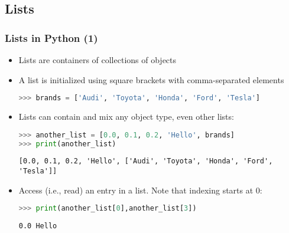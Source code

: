 \subsection{Lists}
\begin{frame}[fragile]
  \frametitle{Lists in Python (1)}
  \begin{itemize}
    \item Lists are containers of collections of objects
    \item A list is initialized using square brackets with comma-separated elements
    \begin{lstlisting}[language=Python,numbers=none]
>>> brands = ['Audi', 'Toyota', 'Honda', 'Ford', 'Tesla']
    \end{lstlisting}
    \item Lists can contain and mix any object type, even other lists:
    \begin{lstlisting}[language=Python,numbers=none]
>>> another_list = [0.0, 0.1, 0.2, 'Hello', brands]
>>> print(another_list)
    \end{lstlisting}
    \begin{lstlisting}[style=PyOutput]
[0.0, 0.1, 0.2, 'Hello', ['Audi', 'Toyota', 'Honda', 'Ford', 'Tesla']]
    \end{lstlisting}
    \item Access (i.e., read) an entry in a list. Note that indexing starts at 0:
    \begin{lstlisting}[language=Python,numbers=none]
>>> print(another_list[0],another_list[3])
    \end{lstlisting}
    \begin{lstlisting}[style=PyOutput]
0.0 Hello
    \end{lstlisting}
  \end{itemize}
 \end{frame}
 
